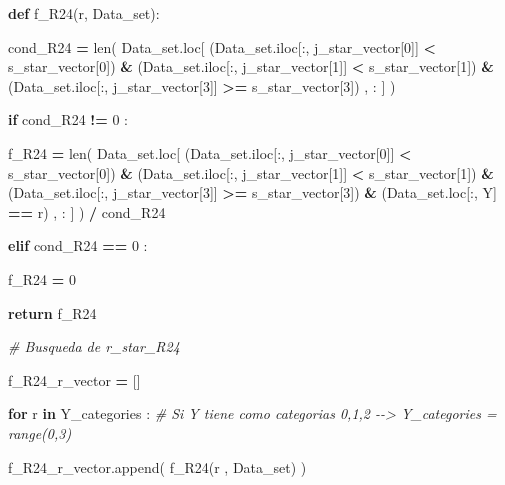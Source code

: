 \documentclass[
  11pt,
  a4paper,
]{article}
\newenvironment{Shaded}{\begin{snugshade}}{\end{snugshade}}
\newcommand{\BuiltInTok}[1]{#1}
\newcommand{\CommentTok}[1]{\textcolor[rgb]{0.56,0.35,0.01}{\textit{#1}}}
\newcommand{\ControlFlowTok}[1]{\textcolor[rgb]{0.13,0.29,0.53}{\textbf{#1}}}
\newcommand{\DecValTok}[1]{\textcolor[rgb]{0.00,0.00,0.81}{#1}}
\newcommand{\KeywordTok}[1]{\textcolor[rgb]{0.13,0.29,0.53}{\textbf{#1}}}
\newcommand{\NormalTok}[1]{#1}
\newcommand{\OperatorTok}[1]{\textcolor[rgb]{0.81,0.36,0.00}{\textbf{#1}}}
\newcommand{\StringTok}[1]{\textcolor[rgb]{0.31,0.60,0.02}{#1}}
\begin{document}
\begin{Shaded}
\begin{Highlighting}[]
                \KeywordTok{def}\NormalTok{ f\_R24(r, Data\_set):}

\NormalTok{                        cond\_R24 }\OperatorTok{=} \BuiltInTok{len}\NormalTok{( Data\_set.loc[ (Data\_set.iloc[:, j\_star\_vector[}\DecValTok{0}\NormalTok{]] }\OperatorTok{\textless{}}\NormalTok{ s\_star\_vector[}\DecValTok{0}\NormalTok{]) }\OperatorTok{\&}\NormalTok{ (Data\_set.iloc[:, j\_star\_vector[}\DecValTok{1}\NormalTok{]] }\OperatorTok{\textless{}}\NormalTok{ s\_star\_vector[}\DecValTok{1}\NormalTok{]) }\OperatorTok{\&}\NormalTok{ (Data\_set.iloc[:, j\_star\_vector[}\DecValTok{3}\NormalTok{]] }\OperatorTok{\textgreater{}=}\NormalTok{ s\_star\_vector[}\DecValTok{3}\NormalTok{]) , : ] ) }

                        \ControlFlowTok{if}\NormalTok{  cond\_R24 }\OperatorTok{!=} \DecValTok{0}\NormalTok{ :}

\NormalTok{                            f\_R24 }\OperatorTok{=} \BuiltInTok{len}\NormalTok{( Data\_set.loc[ (Data\_set.iloc[:, j\_star\_vector[}\DecValTok{0}\NormalTok{]] }\OperatorTok{\textless{}}\NormalTok{ s\_star\_vector[}\DecValTok{0}\NormalTok{]) }\OperatorTok{\&}\NormalTok{ (Data\_set.iloc[:, j\_star\_vector[}\DecValTok{1}\NormalTok{]] }\OperatorTok{\textless{}}\NormalTok{ s\_star\_vector[}\DecValTok{1}\NormalTok{])  }\OperatorTok{\&}\NormalTok{ (Data\_set.iloc[:, j\_star\_vector[}\DecValTok{3}\NormalTok{]] }\OperatorTok{\textgreater{}=}\NormalTok{ s\_star\_vector[}\DecValTok{3}\NormalTok{]) }\OperatorTok{\&}\NormalTok{ (Data\_set.loc[:, }\StringTok{\textquotesingle{}Y\textquotesingle{}}\NormalTok{] }\OperatorTok{==}\NormalTok{ r) , : ] ) }\OperatorTok{/}\NormalTok{ cond\_R24}

                        \ControlFlowTok{elif}\NormalTok{ cond\_R24 }\OperatorTok{==} \DecValTok{0}\NormalTok{ :}

\NormalTok{                            f\_R24 }\OperatorTok{=} \DecValTok{0}

                        \ControlFlowTok{return}\NormalTok{ f\_R24}

                
            \CommentTok{\# Busqueda de r\_star\_R24}

\NormalTok{                f\_R24\_r\_vector }\OperatorTok{=}\NormalTok{ []}

                \ControlFlowTok{for}\NormalTok{ r }\KeywordTok{in}\NormalTok{ Y\_categories :  }\CommentTok{\# Si Y tiene como categorias 0,1,2 {-}{-}\textgreater{} Y\_categories = range(0,3)}

\NormalTok{                    f\_R24\_r\_vector.append( f\_R24(r , Data\_set) )}


\end{Highlighting}
\end{Shaded}
\end{document}
